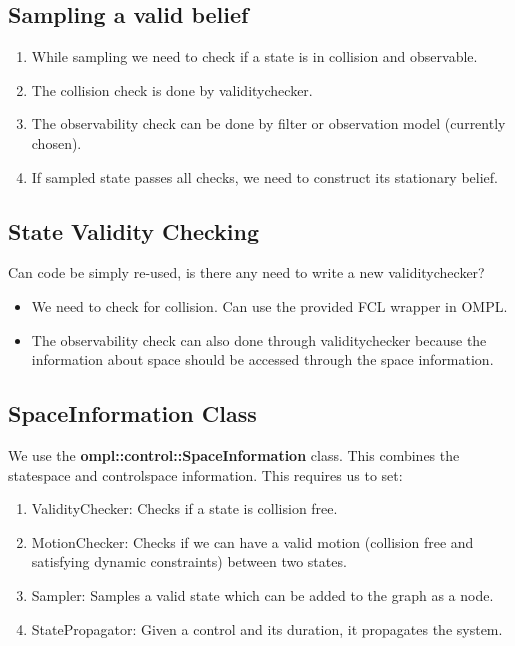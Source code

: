 \subsection{Sampling a valid belief}

\begin{enumerate}
 \item While sampling we need to check if a state is in collision and observable. 
 \item The collision check is done by validitychecker. 
 \item The observability check can be done by filter or observation model (currently chosen).
 \item If sampled state passes all checks, we need to construct its stationary belief.
\end{enumerate}


\subsection{State Validity Checking}
Can code be simply re-used, is there any need to write a new validitychecker? 

\begin{itemize}
 \item We need to check for collision. Can use the provided FCL wrapper in OMPL.
 \item The observability check can also done through validitychecker because the information about space should be accessed through the space information.

\end{itemize}

\subsection{SpaceInformation Class}

We use the \textbf{ompl::control::SpaceInformation} class. This combines the statespace and controlspace information. This requires us to set:
\begin{enumerate}
 \item ValidityChecker: Checks if a state is collision free.
 \item MotionChecker: Checks if we can have a valid motion (collision free and satisfying dynamic constraints) between two states.
 \item Sampler: Samples a valid state which can be added to the graph as a node.
 \item StatePropagator: Given a control and its duration, it propagates the system.
\end{enumerate}

